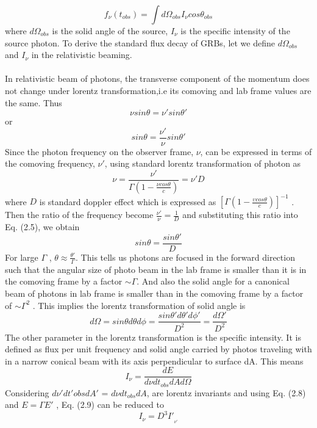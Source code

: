 \begin{equation}
 f_{\nu}(t_{obs})= \int d\Omega_{obs} I_{\nu}cos\theta_{obs}
 \end{equation}
 where  $ d\Omega_{obs}$ is the solid angle of the source, $ I_{\nu} $  is the specific intensity of the source photon. To derive the standard flux decay of GRBs, let we define $ d\Omega_{obs}$   and $ I_{\nu} $ in the relativistic beaming.\\\\ In relativistic beam of photons, the transverse component of the momentum does not change under lorentz transformation,i.e its comoving and lab frame values are the same. Thus
\begin{equation}
\nu sin\theta = \nu'sin\theta'
\end{equation}
or
\begin{equation}
sin\theta =\frac{\nu'}{\nu}sin \theta'
\end{equation}
Since the photon frequency on the observer frame, $ \nu $, can be expressed in terms of the comoving frequency, $ \nu' $, using standard lorentz transformation of photon as
\begin{equation}
\nu =\frac{\nu'}{\Gamma (1 -\frac{\nu cos\theta}{c})} =\nu'D
\end{equation}
where $ D $ is standard doppler effect which is expressed as $ [\Gamma (1 -\frac{\upsilon cos\theta}{c} )]^{-1}$ . Then the ratio of the frequency become $ \frac{\nu'}{\nu} = \frac{1}{D}$ and substituting this ratio into Eq. (2.5), we obtain
\begin{equation}
sin\theta = \frac{sin\theta'}{D}
\end{equation}
For large $\Gamma$ , $\theta  \approx \frac{\theta'}{\Gamma}$. This tells us photons are focused in the forward direction
such that the angular size of photo beam in the lab frame is smaller than it is in the comoving frame by a factor $\sim \Gamma $. And also the solid angle for a canonical beam of
photons in lab frame is smaller than in the comoving frame by a factor of $\sim \Gamma^{2}$ . This implies the lorentz transformation of solid angle is
\begin{equation}
d\Omega =sin\theta d\theta d\phi =\frac{sin\theta'd\theta'd\phi'}{D^{2}}= \frac{d\Omega'}{D^{2}}
\end{equation}
The other parameter in the lorentz transformation is the specific intensity. It is
defined as flux per unit frequency and solid angle carried by photos traveling with in a narrow conical beam with its axis perpendicular to surface dA. This means
\begin{equation}
I_{\nu} =\frac{dE}{d\nu dt_{obs}dAd\Omega}
\end{equation}
Considering $ d\nu'dt'{obs}dA' $ = $ d\nu dt_{obs} dA $, are lorentz invariants and using Eq. (2.8) and $ E=\Gamma E' $ , Eq. (2.9) can be reduced to
\begin{equation}
I_{\nu} =D^{3}I'_{_{\nu'}}
\end{equation}
